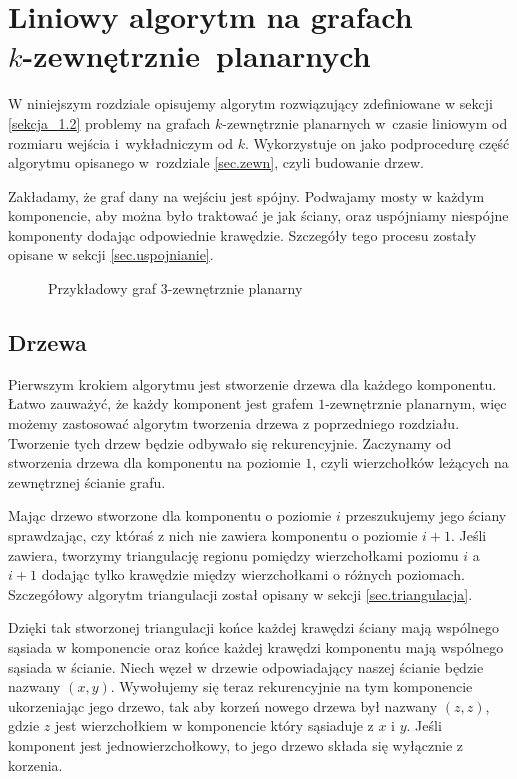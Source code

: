 \documentclass[twoside,a4paper,12pt]{report} %
\theoremstyle{break}
\begin{document}
\chapter[Liniowy algorytm na grafach k-zewnętrznie planarnych]{Liniowy algorytm na grafach \\ $k$-zewnętrznie~planarnych} \label{rozdzial_3}

W niniejszym rozdziale opisujemy algorytm rozwiązujący zdefiniowane w sekcji \ref{sekcja_1.2} problemy na grafach $k$-zewnętrznie planarnych w~czasie liniowym od rozmiaru wejścia i~wykładniczym od $k$. Wykorzystuje on jako podprocedurę część algorytmu opisanego w~rozdziale \ref{sec.zewn}, czyli budowanie drzew.

Zakładamy, że graf dany na wejściu jest spójny. Podwajamy mosty w każdym komponencie, aby można było traktować je jak ściany, oraz uspójniamy niespójne komponenty dodając odpowiednie krawędzie. Szczegóły tego procesu zostały opisane w sekcji \ref{sec.uspojnianie}.

\begin{figure}[ht]
    \centering
    
    \caption{Przykładowy graf $3$-zewnętrznie planarny}
    \label{k-zew_graf}
\end{figure}

\section{Drzewa}

Pierwszym krokiem algorytmu jest stworzenie drzewa dla każdego komponentu. Łatwo zauważyć, że każdy komponent jest grafem $1$-zewnętrznie planarnym, więc możemy zastosować algorytm tworzenia drzewa z poprzedniego rozdziału. Tworzenie tych drzew będzie odbywało się rekurencyjnie. Zaczynamy od stworzenia drzewa dla komponentu na poziomie $1$, czyli wierzchołków leżących na zewnętrznej ścianie grafu.

Mając drzewo stworzone dla komponentu o poziomie $i$ przeszukujemy jego ściany sprawdzając, czy któraś z nich nie zawiera komponentu o poziomie $i+1$. Jeśli zawiera, tworzymy triangulację regionu pomiędzy wierzchołkami poziomu $i$ a $i+1$ dodając tylko krawędzie między wierzchołkami o różnych poziomach. Szczegółowy algorytm triangulacji został opisany w sekcji \ref{sec.triangulacja}. 

Dzięki tak stworzonej triangulacji końce każdej krawędzi ściany mają wspólnego sąsiada w komponencie oraz końce każdej krawędzi komponentu mają wspólnego sąsiada w ścianie. Niech węzeł w drzewie odpowiadający naszej ścianie będzie nazwany $(x, y)$. Wywołujemy się teraz rekurencyjnie na tym komponencie ukorzeniając jego drzewo, tak aby korzeń nowego drzewa był nazwany $(z, z)$, gdzie $z$ jest wierzchołkiem w komponencie który sąsiaduje z $x$ i $y$. Jeśli komponent jest jednowierzchołkowy, to jego drzewo składa się wyłącznie z korzenia.
\end{document}
